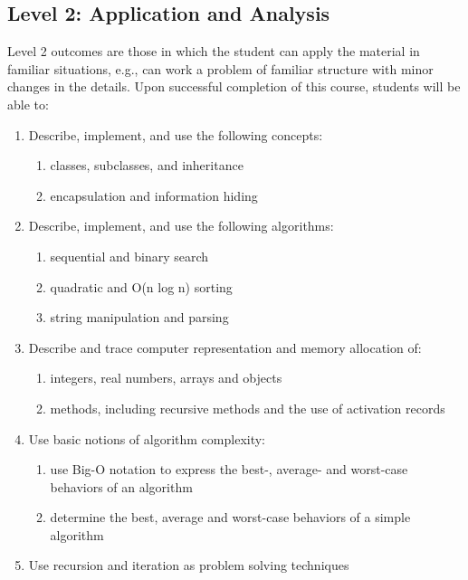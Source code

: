 \documentclass[12pt]{scrartcl}
\begin{document}
\subsection*{Level 2: Application and Analysis}
Level 2 outcomes are those in which the student can apply the material in familiar situations, e.g., can work a problem of familiar structure with minor changes in the details. Upon successful completion of this course, students will be able to:
\begin{enumerate}
    \item Describe, implement, and use the following concepts:
    \begin{enumerate}
        \item classes, subclasses, and inheritance
        \item encapsulation and information hiding
    \end{enumerate}
    
    \item Describe, implement, and use the following algorithms:
    \begin{enumerate}
        \item sequential and binary search
        \item quadratic and O(n log n) sorting
        \item string manipulation and parsing
    \end{enumerate}
    
    \item Describe and trace computer representation and memory allocation of:
    \begin{enumerate}
        \item integers, real numbers, arrays and objects
        \item methods, including recursive methods and the use of activation records
    \end{enumerate}
    
    \item Use basic notions of algorithm complexity:
    \begin{enumerate}
        \item use Big-O notation to express the best-, average- and worst-case behaviors of an algorithm
        \item determine the best, average and worst-case behaviors of a simple algorithm
    \end{enumerate}
    
    \item Use recursion and iteration as problem solving techniques
\end{enumerate}
\end{document}
